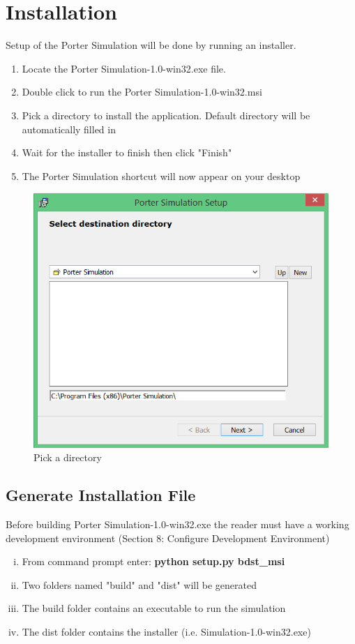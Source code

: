 \documentclass[paper=letter, fontsize=10pt]{scrartcl}
\numberwithin{equation}{section}		%
\numberwithin{figure}{section}			%
\numberwithin{table}{section}				%
\begin{document}
\section{Installation}
Setup of the Porter Simulation will be done by running an installer.
\begin{enumerate}
	\item Locate the Porter Simulation-1.0-win32.exe file.
	\item Double click to run the Porter Simulation-1.0-win32.msi
	\item Pick a directory to install the application. Default directory will be automatically filled in
	\item Wait for the installer to finish then click "Finish"
	\item The Porter Simulation shortcut will now appear on your desktop
\end{enumerate}

\begin{figure}[!htbp]
	\begin{center}
		\includegraphics[width=1\columnwidth, height=0.3\textheight, keepaspectratio]{Installer.png}
		\caption{Pick a directory}
	\end{center}
\end{figure} 

	\subsection{Generate Installation File}
	Before building Porter Simulation-1.0-win32.exe the reader must have a working development environment (Section 8: Configure Development Environment)
	\begin{enumerate}[(i)]
		\item From command prompt enter: \textbf{python setup.py bdst\_msi}
		\item Two folders named "build" and "dist" will be generated
		\item The build folder contains an executable to run the simulation
		\item The dist folder contains the installer (i.e. Simulation-1.0-win32.exe) 	
	\end{enumerate}
\end{document}
